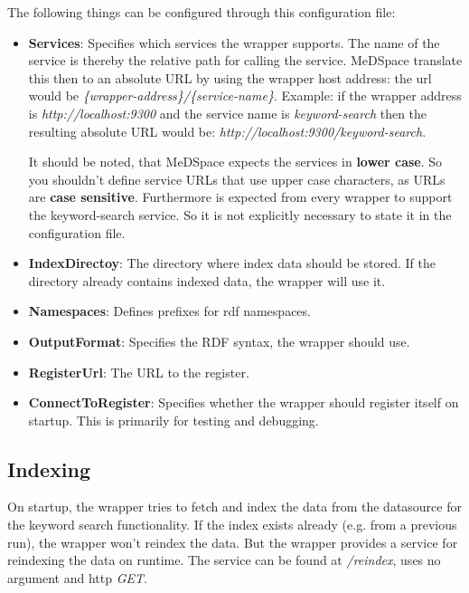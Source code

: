 The following things can be configured through this configuration file:
\begin{itemize}
\item \textbf{Services}: Specifies which services the wrapper supports. The name of the service is thereby the relative path for calling the service. MeDSpace translate this then to an absolute URL by using the wrapper host address: the url would be \emph{\{wrapper-address\}/\{service-name\}}. Example: if the wrapper address is \emph{http://localhost:9300} and the service  name is \emph{keyword-search} then the resulting absolute URL would be: \emph{http://localhost:9300/keyword-search}. 

It should be noted, that MeDSpace expects the services in \textbf{lower case}. So you shouldn't define service URLs that use upper case characters, as URLs are \textbf{case sensitive}.
Furthermore is expected from every wrapper to support the keyword-search service. So it is not explicitly necessary to state it in the configuration file.

\item \textbf{IndexDirectoy}: The directory where index data should be stored. If the directory already contains indexed data, the wrapper will use it.

\item \textbf{Namespaces}: Defines prefixes for rdf namespaces. 

\item \textbf{OutputFormat}: Specifies the RDF syntax, the wrapper should use.

\item \textbf{RegisterUrl}: The URL to the register.

\item \textbf{ConnectToRegister}: Specifies whether the wrapper should register itself on startup. This is primarily for testing and debugging.
\end{itemize}

\subsection{Indexing}

On startup, the wrapper tries to fetch and index the data from the datasource for the keyword search functionality. If the index exists already (e.g. from a previous run), the wrapper won't reindex the data. But the wrapper provides a service for reindexing the data on runtime. The service can be found at \emph{/reindex}, uses no argument and http \emph{GET}.

